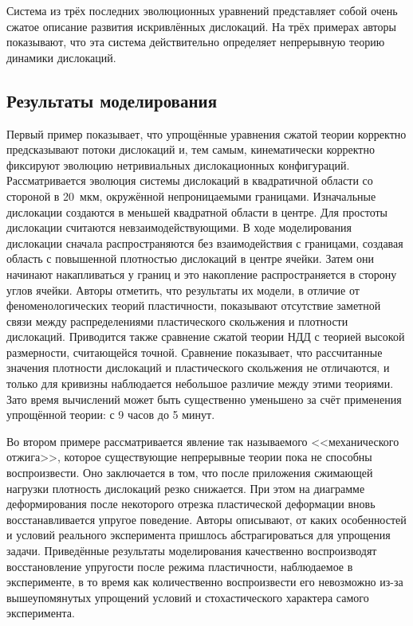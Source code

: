 \documentclass[a4paper, 14pt, titlepage]{extarticle}
\begin{document}
  Система из трёх последних эволюционных уравнений представляет собой очень сжатое описание развития
  искривлённых дислокаций. На трёх примерах авторы показывают, что эта система действительно
  определяет непрерывную теорию динамики дислокаций.

  \subsection{Результаты моделирования}

  Первый пример показывает, что упрощённые уравнения сжатой теории корректно предсказывают потоки
  дислокаций и, тем самым, кинематически корректно фиксируют эволюцию нетривиальных дислокационных
  конфигураций. Рассматривается эволюция системы дислокаций в квадратичной области со стороной в
  20~мкм, окружённой непроницаемыми границами. Изначальные дислокации создаются в меньшей квадратной
  области в центре. Для простоты дислокации считаются невзаимодействующими. В ходе моделирования
  дислокации сначала распространяются без взаимодействия с границами, создавая область с повышенной
  плотностью дислокаций в центре ячейки. Затем они начинают накапливаться у границ и это накопление
  распространяется в сторону углов ячейки. Авторы отметить, что результаты их модели, в отличие от
  феноменологических теорий пластичности, показывают отсутствие заметной связи между распределениями
  пластического скольжения и плотности дислокаций. Приводится также сравнение сжатой теории НДД с
  теорией высокой размерности, считающейся точной. Сравнение показывает, что рассчитанные значения
  плотности дислокаций и пластического скольжения не отличаются, и только для кривизны наблюдается
  небольшое различие между этими теориями. Зато время вычислений может быть существенно уменьшено
  за счёт применения упрощённой теории: с 9 часов до 5 минут.

  Во втором примере рассматривается явление так называемого <<механического отжига>>, которое
  существующие непрерывные теории пока не способны воспроизвести. Оно заключается в том, что после
  приложения сжимающей нагрузки плотность дислокаций резко снижается. При этом на диаграмме
  деформирования после некоторого отрезка пластической деформации вновь восстанавливается упругое
  поведение. Авторы описывают, от каких особенностей и условий реального эксперимента пришлось
  абстрагироваться для упрощения задачи. Приведённые результаты моделирования качественно
  воспроизводят восстановление упругости после режима пластичности, наблюдаемое в эксперименте, в то
  время как количественно воспроизвести его невозможно из-за вышеупомянутых упрощений условий и
  стохастического характера самого эксперимента.
\end{document}
